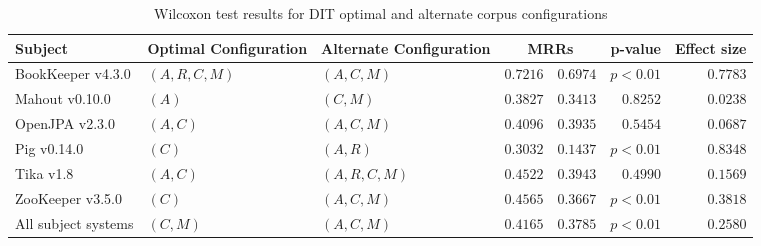 \begin{landscape}
\begin{table}
\begin{spacing}{1.2}
\centering
\caption{Wilcoxon test results for DIT optimal and alternate corpus configurations}
\label{table:combo-dit-corpus-sweep-wilcox}
\begin{tabular}{lllrrrr}
\toprule
                      Subject & Optimal Configuration & Alternate Configuration & \multicolumn{2}{c}{MRRs}  &  p-value & Effect size \\
\midrule
            BookKeeper v4.3.0 &        $(A, R, C, M)$ &             $(A, C, M)$ &    $0.7216$ &      $0.6974$ & $p<0.01$ &    $0.7783$ \\
               Mahout v0.10.0 &                 $(A)$ &                $(C, M)$ &    $0.3827$ &      $0.3413$ & $0.8252$ &    $0.0238$ \\
               OpenJPA v2.3.0 &              $(A, C)$ &             $(A, C, M)$ &    $0.4096$ &      $0.3935$ & $0.5454$ &    $0.0687$ \\
                  Pig v0.14.0 &                 $(C)$ &                $(A, R)$ &    $0.3032$ &      $0.1437$ & $p<0.01$ &    $0.8348$ \\
                    Tika v1.8 &              $(A, C)$ &          $(A, R, C, M)$ &    $0.4522$ &      $0.3943$ & $0.4990$ &    $0.1569$ \\
             ZooKeeper v3.5.0 &                 $(C)$ &             $(A, C, M)$ &    $0.4565$ &      $0.3667$ & $p<0.01$ &    $0.3818$ \\
 \midrule
All subject systems &              $(C, M)$ &             $(A, C, M)$ &    $0.4165$ &      $0.3785$ & $p<0.01$ &    $0.2580$ \\
\bottomrule
\end{tabular}

\end{spacing}
\end{table}

\end{landscape}
